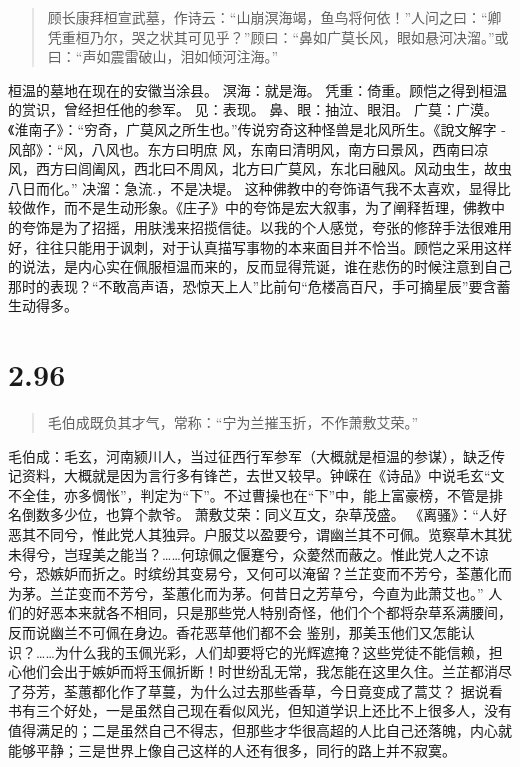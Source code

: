 \documentclass[]{book}
\begin{document}
\begin{quote}
顾长康拜桓宣武墓，作诗云：``山崩溟海竭，鱼鸟将何依！''人问之曰：``卿凭重桓乃尔，哭之状其可见乎？''顾曰：``鼻如广莫长风，眼如悬河决溜。''或曰：``声如震雷破山，泪如倾河注海。''
\end{quote}

桓温的墓地在现在的安徽当涂县。 溟海：就是海。
凭重：倚重。顾恺之得到桓温的赏识，曾经担任他的参军。 见：表现。
鼻、眼：抽泣、眼泪。
广莫：广漠。《淮南子》：``穷奇，广莫风之所生也。''传说穷奇这种怪兽是北风所生。《說文解字
- 风部》：``风，八风也。东方曰明庶
风，东南曰清明风，南方曰景风，西南曰凉风，西方曰闾阖风，西北曰不周风，北方曰广莫风，东北曰融风。风动虫生，故虫八日而化。''
决溜：急流.，不是决堤。
这种佛教中的夸饰语气我不太喜欢，显得比较做作，而不是生动形象。《庄子》中的夸饰是宏大叙事，为了阐释哲理，佛教中的夸饰是为了招摇，用肤浅来招揽信徒。以我的个人感觉，夸张的修辞手法很难用好，往往只能用于讽刺，对于认真描写事物的本来面目并不恰当。顾恺之采用这样的说法，是内心实在佩服桓温而来的，反而显得荒诞，谁在悲伤的时候注意到自己那时的表现？``不敢高声语，恐惊天上人''比前句``危楼高百尺，手可摘星辰''要含蓄生动得多。

\section{2.96}\label{section-142}

\begin{quote}
毛伯成既负其才气，常称：``宁为兰摧玉折，不作萧敷艾荣。''
\end{quote}

毛伯成：毛玄，河南颍川人，当过征西行军参军（大概就是桓温的参谋），缺乏传记资料，大概就是因为言行多有锋芒，去世又较早。钟嵘在《诗品》中说毛玄``文不全佳，亦多惆怅''，判定为``下''。不过曹操也在``下''中，能上富豪榜，不管是排名倒数多少位，也算个款爷。
萧敷艾荣：同义互文，杂草茂盛。
《离骚》：``人好恶其不同兮，惟此党人其独异。户服艾以盈要兮，谓幽兰其不可佩。览察草木其犹未得兮，岂珵美之能当？\ldots{}\ldots{}何琼佩之偃蹇兮，众薆然而蔽之。惟此党人之不谅兮，恐嫉妒而折之。时缤纷其变易兮，又何可以淹留？兰芷变而不芳兮，荃蕙化而为茅。兰芷变而不芳兮，荃蕙化而为茅。何昔日之芳草兮，今直为此萧艾也。''
人们的好恶本来就各不相同，只是那些党人特别奇怪，他们个个都将杂草系满腰间，反而说幽兰不可佩在身边。香花恶草他们都不会
鉴别，那美玉他们又怎能认识？\ldots{}\ldots{}为什么我的玉佩光彩，人们却要将它的光辉遮掩？这些党徒不能信赖，担心他们会出于嫉妒而将玉佩折断！时世纷乱无常，我怎能在这里久住。兰芷都消尽了芬芳，荃蕙都化作了草蔓，为什么过去那些香草，今日竟变成了蒿艾？
据说看书有三个好处，一是虽然自己现在看似风光，但知道学识上还比不上很多人，没有值得满足的；二是虽然自己不得志，但那些才华很高超的人比自己还落魄，内心就能够平静；三是世界上像自己这样的人还有很多，同行的路上并不寂寞。
\end{document}
